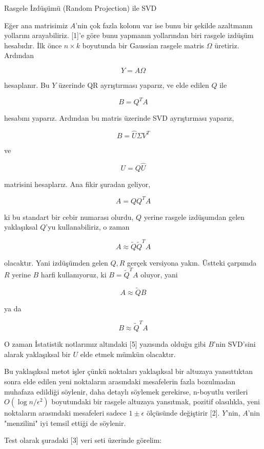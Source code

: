 \documentclass[12pt,fleqn]{article}\usepackage{../../common}
\begin{document}
Rasgele İzdüşümü (Random Projection) ile SVD

Eğer ana matrisimiz $A$'nin çok fazla kolonu var ise bunu bir şekilde
azaltmanın yollarını arayabiliriz. [1]'e göre bunu yapmanın
yollarından biri rasgele izdüşüm hesabıdır. İlk önce $n \times k$
boyutunda bir Gaussian rasgele matris $\Omega$ üretiriz. Ardından

$$ Y = A\Omega $$

hesaplanır. Bu $Y$ üzerinde QR ayrıştırması yaparız, ve elde edilen $Q$ ile

$$ B = Q^T A $$

hesabını yaparız. Ardından bu matris üzerinde SVD ayrıştırması yaparız,

$$ B = \hat{U}\Sigma V^T $$

ve

$$ U = Q\hat{U} $$

matrisini hesaplarız. Ana fikir şuradan geliyor,

$$ A = QQ^TA $$

ki bu standart bir cebir numarası olurdu, $Q$ yerine rasgele
izdüşumdan gelen yaklaşıksal $Q$'yu kullanabiliriz, o zaman

$$ A \approx \tilde{Q}\tilde{Q}^TA $$

olacaktır. Yani izdüşümden gelen $Q,R$ gerçek versiyona yakın. Üstteki
çarpımda $R$ yerine $B$ harfi kullanıyoruz, ki $B = \tilde{Q}^T A$
oluyor, yani

$$ A \approx \tilde{Q}B $$

ya da 

$$ B \approx \tilde{Q}^T A $$

O zaman İstatistik notlarımız altındaki [5] yazısında olduğu gibi $B$'nin
SVD'sini alarak yaklaşıksal bir $U$ elde etmek mümkün olacaktır.

Bu yaklaşıksal metot işler çünkü noktaları yaklaşıksal bir altuzaya
yansıttıktan sonra elde edilen yeni noktaların arasındaki mesafelerin
fazla bozulmadan muhafaza edildiği söylenir, daha detaylı söylemek
gerekirse, n-boyutlu verileri $O(\log n / \epsilon^2)$ boyutundaki bir
rasgele altuzaya yansıtmak, pozitif olasılıkla, yeni noktaların
arasındaki mesafeleri sadece $1 \pm \epsilon$ ölçüsünde değiştirir
[2]. $Y$'nin, $A$'nin "menzilini" iyi temsil ettiği de söylenir.

Test olarak şuradaki [3] veri seti üzerinde görelim:
\end{document}
